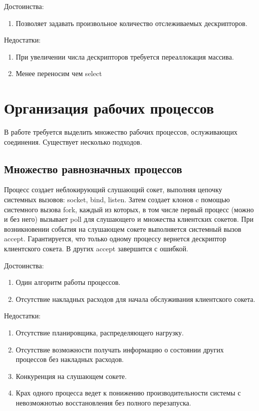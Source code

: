 Достоинства:
\begin{enumerate}
\item Позволяет задавать произвольное количество отслеживаемых дескрипторов.
\end{enumerate}

Недостатки:
\begin{enumerate}
\item При увеличении числа дескрипторов требуется переаллокация массива.
\item Менее переносим чем select~\cite{diff-poll-select}
\end{enumerate}

\section{Организация рабочих процессов}

В работе требуется выделить множество рабочих процессов, ослуживающих соединения.
Существует несколько подходов.

\subsection{Множество равнозначных процессов}

Процесс создает неблокирующий слушающий сокет, выполняя цепочку системных вызовов: socket, bind, listen.
Затем создает клонов c помощью системного вызова fork, каждый из которых, в том числе первый процесс (можно и без него) вызывает poll для слушающего и множества клиентских сокетов.
При возникновении события на слушающем сокете выполняется системный вызов accept.
Гарантируется, что только одному процессу вернется дескриптор клиентского сокета.
В других accept завершится с ошибкой.

Достоинства:
\begin{enumerate}
\item Один алгоритм работы процессов.
\item Отсутствие накладных расходов для начала обслуживания клиентского сокета.
\end{enumerate}

Недостатки:
\begin{enumerate}
\item Отсутствие планировщика, распределяющего нагрузку.
\item Отсутствие возможности получать информацию о состоянии других процессов без накладных расходов.
\item Конкуренция на слушающем сокете.
\item Крах одного процесса ведет к понижению производительности системы с невозможнотью восстановления без полного перезапуска.
\end{enumerate}

